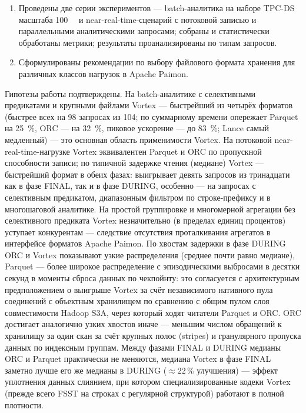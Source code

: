 \begin{enumerate}
        средствами Ansible (Apache Flink, Apache Paimon с модулем
        \texttt{paimon-vortex}, объектное хранилище); автоматизированы развёртывание,
        обновление конфигурации, запуск заданий, сбор метрик, управление жизненным
        циклом кластера.
    \item Проведены две серии экспериментов --- batch-аналитика на наборе TPC-DS
        масштаба \SI{100}{\giga\byte} и near-real-time-сценарий с потоковой записью и
        параллельными аналитическими запросами; собраны и статистически обработаны
        метрики; результаты проанализированы по типам запросов.
    \item Сформулированы рекомендации по выбору файлового формата хранения для
        различных классов нагрузок в Apache Paimon.
\end{enumerate}

Гипотезы работы подтверждены. На batch-аналитике с селективными предикатами и
крупными файлами Vortex --- быстрейший из четырёх форматов (быстрее всех на
\num{98} запросах из \num{104}; по суммарному времени опережает Parquet на
\SI{25}{\percent}, ORC --- на \SI{32}{\percent}, пиковое ускорение --- до
\SI{83}{\percent}; Lance самый медленный) --- это основная область применимости
Vortex. На потоковой
near-real-time-нагрузке Vortex эквивалентен Parquet и ORC по пропускной способности
записи; по типичной задержке чтения (медиане) Vortex --- быстрейший формат в обеих
фазах: выигрывает девять запросов из тринадцати как в фазе FINAL, так и в фазе
DURING, особенно --- на запросах с селективным предикатом, диапазонным фильтром по
строке-префиксу и в многошаговой аналитике. На простой группировке и многомерной
агрегации без селективного предиката Vortex незначительно (в пределах единиц
процентов) уступает конкурентам --- следствие отсутствия проталкивания агрегатов в
интерфейсе форматов Apache Paimon. По хвостам задержки в фазе DURING ORC и Vortex
показывают узкие распределения (среднее почти равно медиане), Parquet --- более
широкое распределение с эпизодическими выбросами в десятки секунд в моменты сброса
данных по чекпойнту: это согласуется с архитектурным предположением о выигрыше
Vortex за счёт независимого нативного пула соединений с объектным хранилищем по
сравнению с общим пулом слоя совместимости Hadoop S3A, через который ходят
читатели Parquet и ORC. ORC достигает аналогично узких хвостов иначе ---
меньшим числом обращений к хранилищу за один скан за счёт крупных полос (stripes)
и гранулярного пропуска данных по индексным группам. Между фазами FINAL
и DURING медианы ORC и Parquet практически не меняются, медиана Vortex в фазе
FINAL заметно лучше его же медианы в DURING ($\approx 22\,\%$ улучшения) ---
эффект уплотнения данных слиянием, при котором специализированные кодеки Vortex
(прежде всего FSST на строках с регулярной структурой) работают в полной
плотности.

